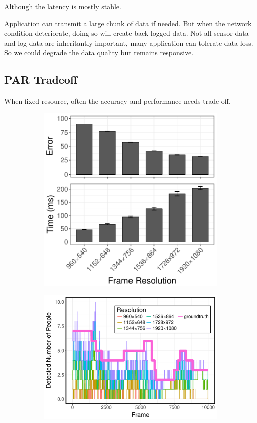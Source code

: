 Although the latency is mostly stable.

Application can transmit a large chunk of data if needed. But when the network
condition deteriorate, doing so will create back-logged data. Not all sensor
data and log data are inheritantly important, many application can tolerate data
loss. So we could degrade the data quality but remains responsive.

\subsection{PAR Tradeoff}
\label{sec:par-tradeoff}

When fixed resource, often the accuracy and performance needs trade-off.

\begin{figure}
  \centering
  \begin{subfigure}{.41\columnwidth}
    \centering
    \includegraphics[width=.95\linewidth]{figures/accuracy-performance.pdf}
    \label{fig:a-vs-p}
  \end{subfigure}
  \begin{subfigure}{.57\columnwidth}
    \centering
    \includegraphics[width=.95\linewidth]{figures/time-series.pdf}

\end{subfigure}
\end{figure}
